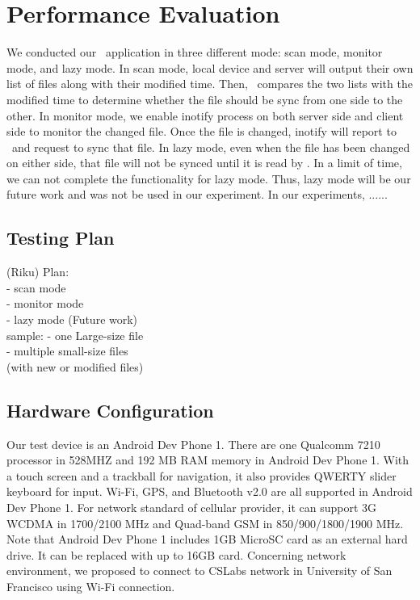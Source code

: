 \section{Performance Evaluation}
\label{sec:Performance}

We conducted our \teledroid\ application in three different mode: scan mode, monitor mode, and lazy mode. In scan mode, local device and server will output their own list of files along with their modified time. Then, \teledroid\ compares the two lists with the modified time to determine whether the file should be sync from one side to the other. In monitor mode, we enable inotify process on both server side and client side to monitor the changed file. Once the file is changed, inotify will report to \teledroid\ and request to sync that file. In lazy mode, even when the file has been changed on either side, that file will not be synced until it is read by \teledroid. In a limit of time, we can not complete the functionality for lazy mode. Thus, lazy mode will be our future work and was not be used in our experiment.
In our experiments, ......

\subsection{Testing Plan}
(Riku)
Plan:\\
	- scan mode\\
	- monitor mode\\
	- lazy mode (Future work)\\
	
	sample:	
		- one Large-size file\\
		- multiple small-size files\\
		(with new or modified files)\\
				
\subsection{Hardware Configuration}
Our test device is an Android Dev Phone 1. There are one Qualcomm 7210 processor in 528MHZ and 192 MB RAM memory in Android 
Dev Phone 1. With a touch screen and a trackball for navigation, it also provides QWERTY slider keyboard for input. Wi-Fi, 
GPS,  and Bluetooth v2.0 are all supported in Android Dev Phone 1. For network standard of cellular provider, it can 
support 3G WCDMA in 1700/2100 MHz and Quad-band GSM in 850/900/1800/1900 MHz. Note that Android Dev Phone 1 includes 1GB 
MicroSC card as an external hard drive. It can be replaced with up to 16GB card. Concerning network environment, we 
proposed to connect to CSLabs network in University of San Francisco using Wi-Fi connection.

